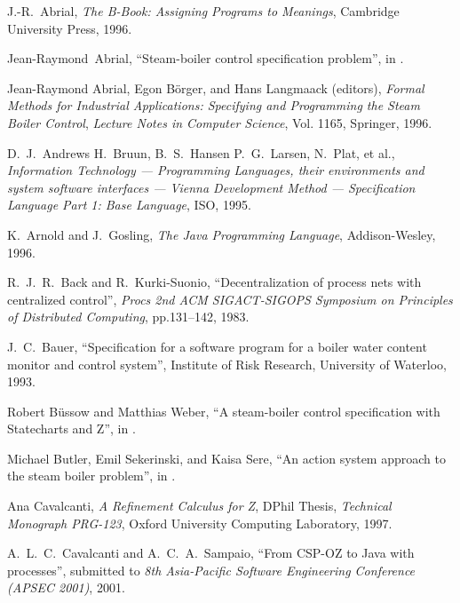 \documentclass{report}
\begin{document}
\begin{thebibliography}{XX}

 J.-R.~Abrial, \emph{The B-Book: Assigning Programs
    to Meanings}, Cambridge University Press, 1996.

 Jean-Raymond~Abrial, ``Steam-boiler control
  specification problem'', in
  \cite[pp.500-510]{abrial-borger-langmaack-96}.

 Jean-Raymond Abrial, Egon
  B\"{o}rger, and Hans Langmaack (editors), \emph{Formal Methods for
  Industrial Applications: Specifying and Programming the Steam Boiler
  Control}, \emph{Lecture Notes in Computer Science}, Vol. 1165,
  Springer, 1996.

 D.~J.~Andrews H.~Bruun,
  B.~S.~Hansen P.~G.~Larsen, N.~Plat, et al., \emph{Information
  Technology --- Programming Languages, their environments and system
  software interfaces --- Vienna Development Method --- Specification
  Language Part 1: Base Language}, ISO, 1995.

 K.~Arnold and J.~Gosling, \emph{The Java
    Programming Language}, Addison-Wesley, 1996.

 R.~J.~R.~Back and R.~Kurki-Suonio,
  ``Decentralization of process nets with centralized control'',
  \emph{Procs 2nd ACM SIGACT-SIGOPS Symposium on Principles of
  Distributed Computing}, pp.131--142, 1983.

 J.~C.~Bauer, ``Specification for a software program
  for a boiler water content monitor and control system'', Institute
  of Risk Research, University of Waterloo, 1993.

 Robert B\"{u}ssow and Matthias Weber, ``A
  steam-boiler control specification with Statecharts and Z'', in
  \cite[pp.109--128]{abrial-borger-langmaack-96}.

 Michael Butler, Emil Sekerinski,
  and Kaisa Sere, ``An action system approach to the steam boiler
  problem'', in \cite[pp.129--148]{abrial-borger-langmaack-96}.

 Ana Cavalcanti, \emph{A Refinement Calculus
    for Z}, DPhil Thesis, \emph{Technical Monograph PRG-123}, Oxford
    University Computing Laboratory, 1997.

 A.~L.~C.~Cavalcanti and
  A.~C.~A.~Sampaio, ``From CSP-OZ to Java with processes'', submitted
  to \emph{8th Asia-Pacific Software Engineering Conference (APSEC
    2001)}, 2001.


\end{thebibliography}
\end{document}
